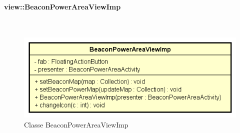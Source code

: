 \documentclass[../DefinizioneDiProdotto.tex]{subfiles}
\begin{document}
\paragraph{view::BeaconPowerAreaViewImp}
\
\begin{figure}[H]
	\centering
	\includegraphics[width=\maxwidth]{img/BeaconPowerAreaViewImp.png}
	\caption{Classe BeaconPowerAreaViewImp}\label{fig:view::BeaconPowerAreaViewImp} 
\end{figure}
\end{document}

